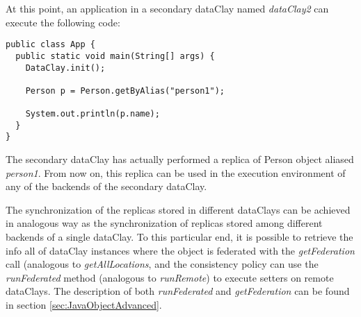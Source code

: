 At this point, an application in a secondary dataClay named \textit{dataClay2} can execute the following code:

\begin{tBox}
\begin{lstlisting}
public class App {
  public static void main(String[] args) {
    DataClay.init();
    
    Person p = Person.getByAlias("person1");
    
    System.out.println(p.name);
  }
}
\end{lstlisting}
\end{tBox}

The secondary dataClay has actually performed a replica of Person object aliased \textit{person1}. From now on, this 
replica can be used in the execution environment of any of the backends of the secondary dataClay.

The synchronization of the replicas stored in different dataClays can be achieved in analogous way as the synchronization 
of replicas stored among different backends of a single dataClay. To this particular end, it is possible to retrieve the info
all of dataClay instances where the object is federated with the \textit{getFederation} call (analogous to \textit{getAllLocations}, 
and the consistency policy can use the \textit{runFederated} method (analogous to \textit{runRemote}) to execute setters on remote dataClays.
The description of both \textit{runFederated} and \textit{getFederation} can be found in section \ref{sec:JavaObjectAdvanced}.

